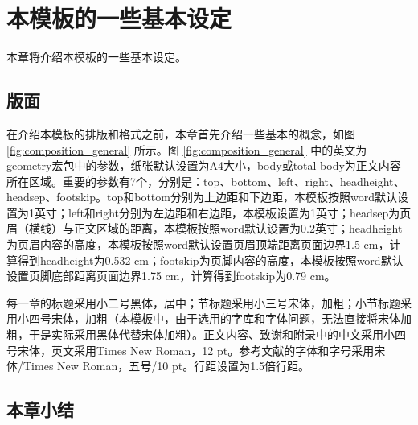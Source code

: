 \chapter{本模板的一些基本设定}
\label{cha:format}
本章将介绍本模板的一些基本设定。
\section{版面}
\label{sec:composition}
在介绍本模板的排版和格式之前，本章首先介绍一些基本的概念，如图 \ref{fig:composition_general} 所示。图 \ref{fig:composition_general} 中的英文为geometry宏包中的参数，纸张默认设置为A4大小，body或total body为正文内容所在区域。重要的参数有7个，分别是：top、bottom、left、right、headheight、headsep、footskip。top和bottom分别为上边距和下边距，本模板按照word默认设置为1英寸；left和right分别为左边距和右边距，本模板设置为1英寸；headsep为页眉（横线）与正文区域的距离，本模板按照word默认设置为0.2英寸；headheight为页眉内容的高度，本模板按照word默认设置页眉顶端距离页面边界1.5 cm，计算得到headheight为0.532 cm；footskip为页脚内容的高度，本模板按照word默认设置页脚底部距离页面边界1.75 cm，计算得到footskip为0.79 cm。


每一章的标题采用小二号黑体，居中；节标题采用小三号宋体，加粗；小节标题采用小四号宋体，加粗（本模板中，由于选用的字库和字体问题，无法直接将宋体加粗，于是实际采用黑体代替宋体加粗）。正文内容、致谢和附录中的中文采用小四号宋体，英文采用Times New Roman，12 pt。参考文献的字体和字号采用宋体/Times New Roman，五号/10 pt。行距设置为1.5倍行距。

\section{本章小结}

